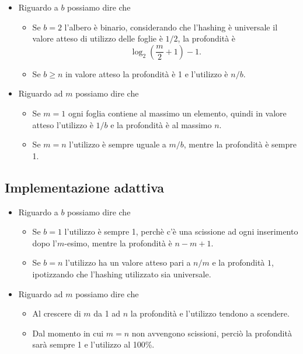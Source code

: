 \documentclass[a4paper]{article}
\begin{document}
\begin{itemize}
	\item Riguardo a $b$ possiamo dire che
	\begin{itemize}
		\item Se $b = 2$ l'albero è binario, considerando che l'hashing è universale il valore atteso di utilizzo delle foglie è $1/2$, la profondità è
			$$ \log_2 \left( \frac{m}{2} + 1 \right) - 1. $$
		\item Se $b \geq n$ in valore atteso la profondità è 1 e l'utilizzo è $n / b$.
	\end{itemize}
	\item Riguardo ad $m$ possiamo dire che
	\begin{itemize}
		\item Se $m = 1$ ogni foglia contiene al massimo un elemento, quindi in valore atteso l'utilizzo è $1 / b$ e la profondità è al massimo $n$.
		\item Se $m = n$ l'utilizzo è sempre uguale a $m / b$, mentre la profondità è sempre 1.
	\end{itemize}
\end{itemize}

\subsection{Implementazione adattiva}

\begin{itemize}
	\item Riguardo a $b$ possiamo dire che
	\begin{itemize}
		\item Se $b = 1$ l'utilizzo è sempre 1, perchè c'è una scissione ad ogni inserimento dopo l'$m$-esimo, mentre la profondità è $n - m + 1$.
		\item Se $b = n$ l'utilizzo ha un valore atteso pari a $n/m$ e la profondità $1$, ipotizzando che l'hashing utilizzato sia universale.
	\end{itemize}
	\item Riguardo ad $m$ possiamo dire che
	\begin{itemize}
		\item Al crescere di $m$ da 1 ad $n$ la profondità e l'utilizzo tendono a scendere. 
		\item Dal momento in cui $m = n$ non avvengono scissioni, perciò la profondità sarà sempre 1 e l'utilizzo al 100\%.
	\end{itemize}
\end{itemize}
\end{document}
